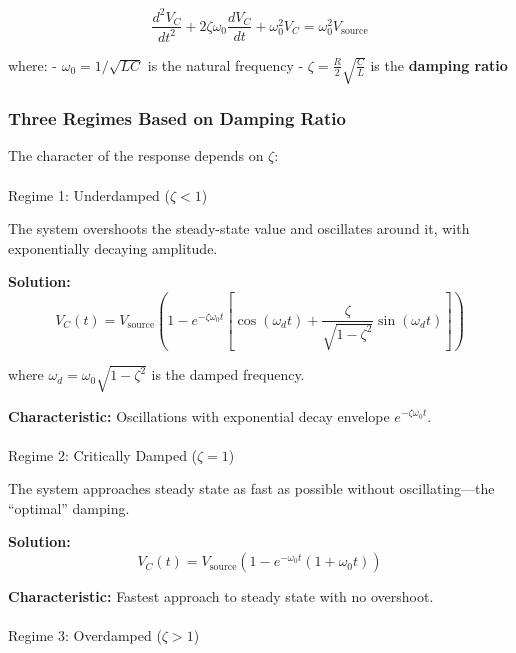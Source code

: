 \documentclass[
]{article}
\makeatletter
\let\oldparagraph\paragraph
\renewcommand{\paragraph}{
    \@ifstar
      \xxxParagraphStar
      \xxxParagraphNoStar
  }
\newcommand{\xxxParagraphStar}[1]{\oldparagraph*{#1}\mbox{}}
\newcommand{\xxxParagraphNoStar}[1]{\oldparagraph{#1}\mbox{}}
\makeatother
\begin{document}
\[\boxed{\frac{d^2V_C}{dt^2} + 2\zeta\omega_0\frac{dV_C}{dt} + \omega_0^2 V_C = \omega_0^2 V_{\text{source}}}\]

where: - \(\omega_0 = 1/\sqrt{LC}\) is the natural frequency -
\(\zeta = \frac{R}{2}\sqrt{\frac{C}{L}}\) is the \textbf{damping ratio}

\subsubsection{Three Regimes Based on Damping
Ratio}\label{three-regimes-based-on-damping-ratio}

The character of the response depends on \(\zeta\):

\paragraph{\texorpdfstring{Regime 1: Underdamped
(\(\zeta < 1\))}{Regime 1: Underdamped (\textbackslash zeta \textless{} 1)}}\label{regime-1-underdamped-zeta-1}

The system overshoots the steady-state value and oscillates around it,
with exponentially decaying amplitude.

\textbf{Solution:}
\[V_C(t) = V_{\text{source}}\left(1 - e^{-\zeta\omega_0 t}\left[\cos(\omega_d t) + \frac{\zeta}{\sqrt{1-\zeta^2}}\sin(\omega_d t)\right]\right)\]

where \(\omega_d = \omega_0\sqrt{1 - \zeta^2}\) is the damped frequency.

\textbf{Characteristic:} Oscillations with exponential decay envelope
\(e^{-\zeta\omega_0 t}\).

\paragraph{\texorpdfstring{Regime 2: Critically Damped
(\(\zeta = 1\))}{Regime 2: Critically Damped (\textbackslash zeta = 1)}}\label{regime-2-critically-damped-zeta-1}

The system approaches steady state as fast as possible without
oscillating---the ``optimal'' damping.

\textbf{Solution:}
\[V_C(t) = V_{\text{source}}(1 - e^{-\omega_0 t}(1 + \omega_0 t))\]

\textbf{Characteristic:} Fastest approach to steady state with no
overshoot.

\paragraph{\texorpdfstring{Regime 3: Overdamped
(\(\zeta > 1\))}{Regime 3: Overdamped (\textbackslash zeta \textgreater{} 1)}}\label{regime-3-overdamped-zeta-1}
\end{document}
